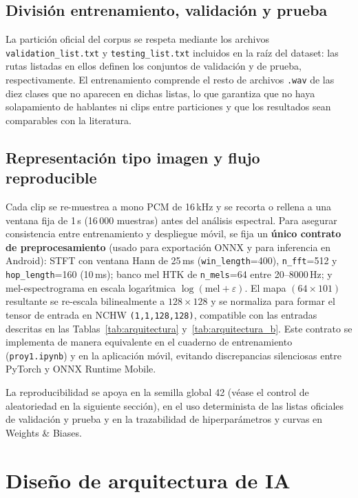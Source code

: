 \documentclass[conference]{IEEEtran}
\begin{document}
\subsection{División entrenamiento, validación y prueba}
La partición oficial del corpus se respeta mediante los archivos \texttt{validation\_list.txt} y \texttt{testing\_list.txt} incluidos en la raíz del dataset: las rutas listadas en ellos definen los conjuntos de validación y de prueba, respectivamente. El entrenamiento comprende el resto de archivos \texttt{.wav} de las diez clases que no aparecen en dichas listas, lo que garantiza que no haya solapamiento de hablantes ni clips entre particiones y que los resultados sean comparables con la literatura.

\subsection{Representación tipo imagen y flujo reproducible}
Cada clip se re-muestrea a mono PCM de 16\,kHz y se recorta o rellena a una ventana fija de 1\,s (16\,000 muestras) antes del análisis espectral. Para asegurar consistencia entre entrenamiento y despliegue m\'ovil, se fija un \textbf{\'unico contrato de preprocesamiento} (usado para exportaci\'on ONNX y para inferencia en Android): STFT con ventana Hann de 25\,ms (\texttt{win\_length}=400), \texttt{n\_fft}=512 y \texttt{hop\_length}=160 (10\,ms); banco mel HTK de \texttt{n\_mels}=64 entre 20--8000\,Hz; y mel-espectrograma en escala logar\'{\i}tmica \(\log(\text{mel}+\varepsilon)\). El mapa \((64\times101)\) resultante se re-escala bilinealmente a \(128\times128\) y se normaliza para formar el tensor de entrada en NCHW \texttt{(1,1,128,128)}, compatible con las entradas descritas en las Tablas~\ref{tab:arquitectura} y~\ref{tab:arquitectura_b}. Este contrato se implementa de manera equivalente en el cuaderno de entrenamiento (\texttt{proy1.ipynb}) y en la aplicaci\'on m\'ovil, evitando discrepancias silenciosas entre PyTorch y ONNX Runtime Mobile.

La reproducibilidad se apoya en la semilla global 42 (v\'ease el control de aleatoriedad en la siguiente secci\'on), en el uso determinista de las listas oficiales de validaci\'on y prueba y en la trazabilidad de hiperpar\'ametros y curvas en Weights \& Biases.

\section{Diseño de arquitectura de IA}
\end{document}

